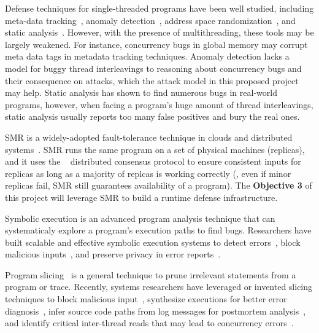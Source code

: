  Defense techniques for 
single-threaded programs have been well studied, including meta-data 
tracking~\cite{taintdroid:osdi10, lift:micro06, myers:information, 
valgrind:pldi}, anomaly 
detection~\cite{taskrecycling:ppopp90,schonberg:pldi89}, address space 
randomization~\cite{ aslr-fail:ccs04}, and static 
analysis~\cite{seth:pldi,engler:vmcai,wagner:syscall:ids,coverity:cacm, 
klee:osdi08}. However, with the presence of 
multithreading, these tools may be largely weakened. For instance, concurrency 
bugs in global memory may corrupt meta data tags in metadata tracking 
techniques. Anomaly detection lacks a model for buggy thread interleavings to 
reasoning about concurrency bugs and their consequence on attacks, which the 
attack model in this proposed project may help. Static analysis has shown to 
find numerous bugs in real-world programs, however, when facing a program's 
huge amount of thread interleavings, static analysis usually reports too many 
false positives and bury the real ones.

  SMR is a widely-adopted 
fault-tolerance technique in clouds and distributed 
systems~\cite{lamportclock,smr:tutorial}. SMR runs the same program on a set of 
physical machines (replicas), and it uses the 
\paxos~\cite{paxos,paxos:simple,paxos:complex} distributed consensus protocol to 
ensure consistent inputs for replicas as long as a majority of replcas is 
working correctly (\ie, even if minor replicas fail, SMR still guarantees 
availability of a program). The \textbf{Objective 3} of this project will 
leverage SMR to build a runtime defense infrastructure.

 Symbolic execution is an advanced program 
analysis technique that can systematicaly explore a program's execution paths 
to find bugs.  Researchers have built
scalable and effective symbolic execution systems to detect
errors~\cite{dart:pldi,cute:fse,godefroid:grammar-fuzzing,
godefroid:whitebox-fuzzing,
klee:osdi08,yang:malicious-disk:oakland06,cadar:exe:ccs06,s2e:hotdep09,
taas:socc10}, block malicious inputs~\cite{castro:bouncer}, and preserve 
privacy in error reports~\cite{castro:bug-report-privacy}.

  Program slicing~\cite{Tip:slicing} is a general
technique to prune irrelevant statements from a program or trace.
Recently, systems researchers have leveraged or invented slicing
techniques to block malicious input~\cite{castro:bouncer}, synthesize
executions for better error diagnosis~\cite{esd:eurosys10}, infer source
code paths from log messages for postmortem analysis~\cite{sherlog:asplos10}, 
and identify critical inter-thread reads that may lead to concurrency 
errors~\cite{conseq:asplos11}.

